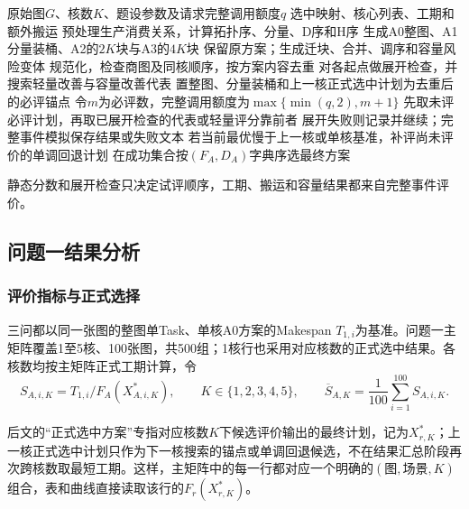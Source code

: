\begin{algorithm}[H]\caption{问题一有限候选生成与完整评价}
\begin{algorithmic}[1]
\REQUIRE 原始图$G$、核数$K$、题设参数及请求完整调用额度$q$
\ENSURE 选中映射、核心列表、工期和额外搬运
\STATE 预处理生产消费关系，计算拓扑序、分量、D序和H序
\STATE 生成A0整图、A1分量装桶、A2的$2K$块与A3的$4K$块
\STATE 保留原方案；生成迁块、合并、调序和容量风险变体
\STATE 规范化，检查商图及同核顺序，按方案内容去重
\ENDFOR
\STATE 对各起点做展开检查，并搜索轻量改善与容量改善代表
\STATE 置整图、分量装桶和上一核正式选中计划为去重后的必评锚点
\STATE 令$m$为必评数，完整调用额度为$\max\{\min(q,2),m+1\}$
\STATE 先取未评必评计划，再取已展开检查的代表或轻量评分靠前者
\STATE 展开失败则记录并继续；完整事件模拟保存结果或失败文本
\ENDWHILE
\STATE 若当前最优慢于上一核或单核基准，补评尚未评价的单调回退计划
\STATE 在成功集合按$(F_A,D_A)$字典序选最终方案
\end{algorithmic}\end{algorithm}

静态分数和展开检查只决定试评顺序，工期、搬运和容量结果都来自完整事件评价。

\subsection{问题一结果分析}
\subsubsection{评价指标与正式选择}
三问都以同一张图的整图单Task、单核A0方案的Makespan $T_{1,i}$为基准。问题一主矩阵覆盖1至5核、100张图，共500组；1核行也采用对应核数的正式选中结果。各核数均按主矩阵正式工期计算，令
\begin{equation}
S_{A,i,K}=T_{1,i}/F_A(X^*_{A,i,K}),\qquad K\in\{1,2,3,4,5\},\qquad
\overline S_{A,K}=\frac1{100}\sum_{i=1}^{100}S_{A,i,K}.
\label{eq:a-speedup}
\end{equation}


后文的“正式选中方案”专指对应核数$K$下候选评价输出的最终计划，记为$X^*_{r,K}$；上一核正式选中计划只作为下一核搜索的锚点或单调回退候选，不在结果汇总阶段再次跨核数取最短工期。这样，主矩阵中的每一行都对应一个明确的$(\text{图},\text{场景},K)$组合，表和曲线直接读取该行的$F_r(X^*_{r,K})$。

